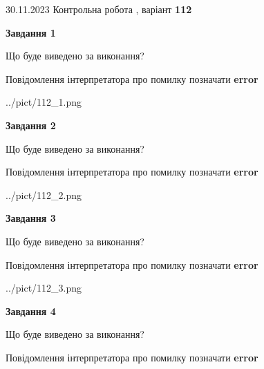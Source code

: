 \documentclass[12pt, ukrainian]{article}
\begin{document}
{{30.11.2023 Контрольна робота , варіант  \No \textbf { 112 }\par}}
{




{\begin {center}\textbf{Завдання 1}\end {center}}\par
Що буде виведено за виконання? \par
Повідомлення інтерпретатора про помилку позначати \textbf{error}

\begin{center}
	{../pict/112_1.png}
\end{center}
\newpage

{\begin {center}\textbf{Завдання 2}\end {center}}\par
Що буде виведено за виконання? \par
Повідомлення інтерпретатора про помилку позначати \textbf{error}

\begin{center}
	{../pict/112_2.png}
\end{center}
\newpage

{\begin {center}\textbf{Завдання 3}\end {center}}\par
Що буде виведено за виконання? \par
Повідомлення інтерпретатора про помилку позначати \textbf{error}

\begin{center}
	{../pict/112_3.png}
\end{center}
\newpage

{\begin {center}\textbf{Завдання 4}\end {center}}\par
Що буде виведено за виконання? \par
Повідомлення інтерпретатора про помилку позначати \textbf{error}

}
\end{document}
